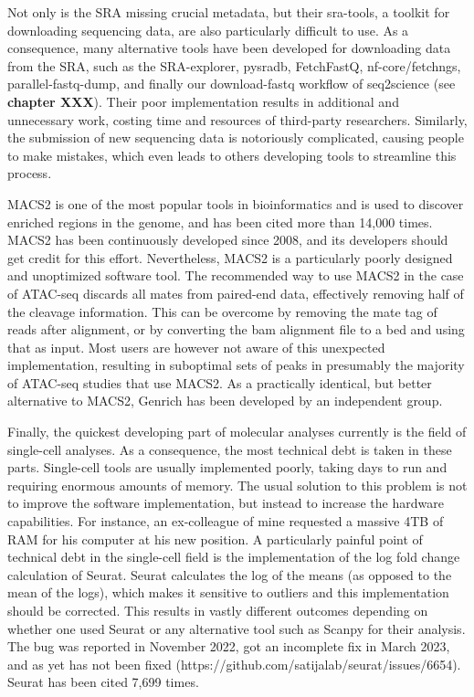 Not only is the SRA missing crucial metadata, but their sra-tools, a toolkit for downloading sequencing data, are also particularly difficult to use. As a consequence, many alternative tools have been developed for downloading data from the SRA, such as the SRA-explorer\cite{sraexplorer}, pysradb\cite{pysradb}, FetchFastQ\cite{galvez2022metadata}, nf-core/fetchngs\cite{fetchngs}, parallel-fastq-dump\cite{parallelfastq}, and finally our download-fastq workflow of seq2science\cite{seq2science} (see \textbf{chapter XXX}). Their poor implementation results in additional and unnecessary work, costing time and resources of third-party researchers. Similarly, the submission of new sequencing data is notoriously complicated, causing people to make mistakes, which even leads to others developing tools to streamline this process\cite{Quiones2020}. 

MACS2 is one of the most popular tools in bioinformatics and is used to discover enriched regions in the genome, and has been cited more than 14,000 times\cite{Zhang2008}. MACS2 has been continuously developed since 2008, and its developers should get credit for this effort. Nevertheless, MACS2 is a particularly poorly designed and unoptimized software tool. The recommended way to use MACS2 in the case of ATAC-seq discards all mates from paired-end data, effectively removing half of the cleavage information\cite{Gaspar2018}. This can be overcome by removing the mate tag of reads after alignment, or by converting the bam alignment file to a bed and using that as input. Most users are however not aware of this unexpected implementation, resulting in suboptimal sets of peaks in presumably the majority of ATAC-seq studies that use MACS2. As a practically identical, but better alternative to MACS2, Genrich has been developed by an independent group\cite{genrich}. 

Finally, the quickest developing part of molecular analyses currently is the field of single-cell analyses. As a consequence, the most technical debt is taken in these parts. Single-cell tools are usually implemented poorly, taking days to run and requiring enormous amounts of memory\cite{Pratapa_2020}. The usual solution to this problem is not to improve the software implementation, but instead to increase the hardware capabilities. For instance, an ex-colleague of mine requested a massive 4TB of RAM for his computer at his new position. A particularly painful point of technical debt in the single-cell field is the implementation of the log fold change calculation of Seurat. Seurat calculates the log of the means (as opposed to the mean of the logs), which makes it sensitive to outliers and this implementation should be corrected. This results in vastly different outcomes depending on whether one used Seurat or any alternative tool such as Scanpy for their analysis. The bug was reported in November 2022, got an incomplete fix in March 2023, and as yet has not been fixed (https://github.com/satijalab/seurat/issues/6654). Seurat has been cited 7,699 times.

